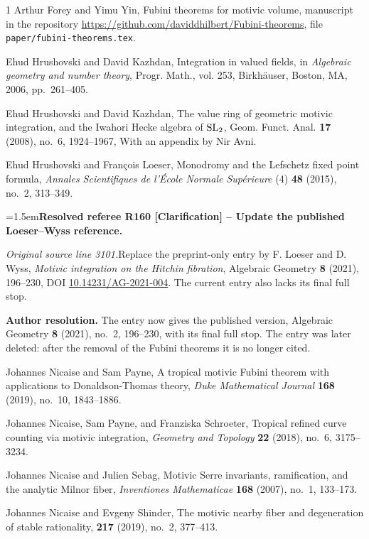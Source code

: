 \documentclass[12pt]{amsart}
\newcommand{\ResolvedRefereeRemark}[5]{%
  \par\medskip\begingroup\normalfont\small\color{gray}%
  \emergencystretch=1.5em\noindent\textbf{Resolved referee R#1 [#2] -- #3.}\par\nobreak\noindent #4\par
  \medskip\color{ResolutionGreen}\noindent\textbf{Author resolution.} #5\par
  \endgroup\medskip
}
\theoremstyle{plain}
\theoremstyle{definition}
\theoremstyle{remark}
\numberwithin{equation}{section}
\theoremstyle{plain}
\newcommand{\0}{\emptyset}
\begin{document}
\begin{thebibliography}{1}
Arthur Forey and Yimu Yin, {Fubini theorems for motivic volume}, manuscript in the repository \url{https://github.com/daviddhilbert/Fubini-theorems}, file \texttt{paper/fubini-theorems.tex}.

Ehud Hrushovski and David Kazhdan, {Integration in valued fields}, in
  {\em Algebraic geometry and number theory}, Progr. Math., vol. 253, Birkh\"{a}user,
  Boston, MA, 2006, pp.~261--405.

Ehud Hrushovski and David Kazhdan, {The value ring of geometric motivic integration, and the
  {I}wahori {H}ecke algebra of {${\rm SL}_2$}}, Geom. Funct. Anal. \textbf{17} (2008),
  no.~6, 1924--1967, With an appendix by Nir Avni.

Ehud Hrushovski and Fran{\c{c}}ois Loeser, {Monodromy and the {L}efschetz
  fixed point formula}, {\em Annales Scientifiques de l'\'Ecole Normale Sup\'erieure} (4) \textbf{48} (2015),
  no.~2, 313--349.

\ResolvedRefereeRemark{160}{Clarification}{Update the published Loeser--Wyss reference}{%
\textit{Original source line 3101.}\quad Replace the preprint-only entry by F. Loeser and D. Wyss, \emph{Motivic integration on the Hitchin fibration}, Algebraic Geometry \textbf{8} (2021), 196--230, DOI \href{https://doi.org/10.14231/AG-2021-004}{10.14231/AG-2021-004}. The current entry also lacks its final full stop.
}{The entry now gives the published version, Algebraic Geometry \textbf{8} (2021), no.~2, 196--230, with its final full stop. The entry was later deleted: after the removal of the Fubini theorems it is no longer cited.}


Johannes Nicaise and Sam Payne, {A tropical motivic {F}ubini theorem with
  applications to {D}onaldson-{T}homas theory}, {\em Duke Mathematical Journal} \textbf{168} (2019), no.~10, 1843–1886.

Johannes Nicaise, Sam Payne, and Franziska Schroeter,
{Tropical refined curve counting via motivic integration}, {\em Geometry and Topology} \textbf{22} (2018),  no.~6, 3175--3234.

Johannes Nicaise and Julien Sebag,
{Motivic Serre invariants, ramification, and the analytic Milnor fiber}, {\em Inventiones Mathematicae} \textbf{168}  (2007), no.~1, 133--173.

Johannes Nicaise and Evgeny Shinder,
\newblock The motivic nearby fiber and degeneration of stable rationality,
 \textbf{217} (2019), no.~2, 377--413.



\end{thebibliography}
\end{document}
